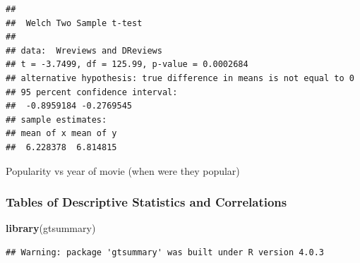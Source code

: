 \documentclass[]{article}
\newenvironment{Shaded}{\begin{snugshade}}{\end{snugshade}}
\newcommand{\KeywordTok}[1]{\textcolor[rgb]{0.13,0.29,0.53}{\textbf{#1}}}
\newcommand{\NormalTok}[1]{#1}
\newcommand{\OperatorTok}[1]{\textcolor[rgb]{0.81,0.36,0.00}{\textbf{#1}}}
\newcommand{\StringTok}[1]{\textcolor[rgb]{0.31,0.60,0.02}{#1}}
\begin{document}
\begin{verbatim}
## 
##  Welch Two Sample t-test
## 
## data:  Wreviews and DReviews
## t = -3.7499, df = 125.99, p-value = 0.0002684
## alternative hypothesis: true difference in means is not equal to 0
## 95 percent confidence interval:
##  -0.8959184 -0.2769545
## sample estimates:
## mean of x mean of y 
##  6.228378  6.814815
\end{verbatim}

Popularity vs year of movie (when were they popular)

\subsubsection{Tables of Descriptive Statistics and Correlations}
\label{sec:correlation-tables}


\begin{Shaded}
\begin{Highlighting}[]
\KeywordTok{library}\NormalTok{(gtsummary)}
\end{Highlighting}
\end{Shaded}

\begin{verbatim}
## Warning: package 'gtsummary' was built under R version 4.0.3
\end{verbatim}

\begin{Shaded}
\end{Shaded}
\end{document}
